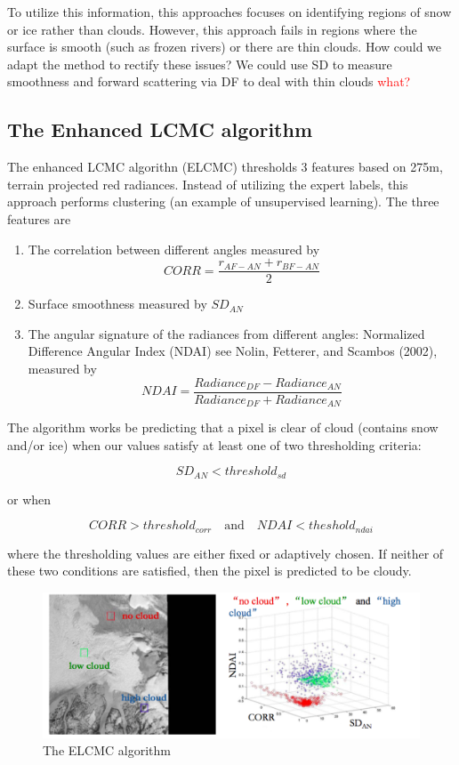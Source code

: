 To utilize this information, this approaches focuses on identifying regions of snow or ice rather than clouds. However, this approach fails in regions where the surface is smooth (such as frozen rivers) or there are thin clouds. How could we adapt the method to rectify these issues? We could use SD to measure smoothness and forward scattering via DF to deal with thin clouds \textcolor{red}{what?}

\subsection*{The Enhanced LCMC algorithm}

The enhanced LCMC algorithn (ELCMC) thresholds 3 features based on 275m, terrain projected red radiances. Instead of utilizing the expert labels, this approach performs clustering (an example of unsupervised learning). The three features are

\begin{enumerate}
\item The correlation between different angles measured by 
$$CORR = \frac{r_{AF - AN} + r_{BF - AN}}{2}$$
\item Surface smoothness measured by $SD_{AN}$
\item The angular signature of the radiances from different angles: Normalized Difference Angular Index (NDAI) see Nolin, Fetterer, and Scambos (2002), measured by
$$NDAI = \frac{Radiance_{DF} - Radiance_{AN}}{Radiance_{DF} + Radiance_{AN}}$$
\end{enumerate}

The algorithm works be predicting that a pixel is clear of cloud (contains snow and/or ice) when our values satisfy at least one of two thresholding criteria:

$$SD_{AN} < threshold_{sd}$$

or when

$$ CORR > threshold_{corr} ~~~ \textrm{ and } ~~~ NDAI < theshold_{ndai}$$

where the thresholding values are either fixed or adaptively chosen. If neither of these two conditions are satisfied, then the pixel is predicted to be cloudy.


\begin{figure}[H]
\begin{center}
\includegraphics[scale=0.4]{ELCMC.png}
\end{center}
\caption{The ELCMC algorithm}
\label{fig:elcmc}
\end{figure}

